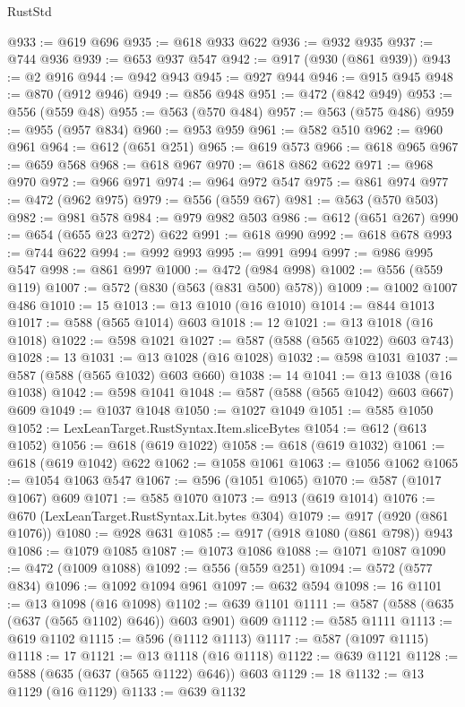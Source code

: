 \begin{lexlean}{RustStd}
\begin{coremodule}
@933 := @619 @696
@935 := @618 @933 @622
@936 := @932 @935
@937 := @744 @936
@939 := @653 @937 @547
@942 := @917 (@930 (@861 @939))
@943 := @2 @916
@944 := @942 @943
@945 := @927 @944
@946 := @915 @945
@948 := @870 (@912 @946)
@949 := @856 @948
@951 := @472 (@842 @949)
@953 := @556 (@559 @48)
@955 := @563 (@570 @484)
@957 := @563 (@575 @486)
@959 := @955 (@957 @834)
@960 := @953 @959
@961 := @582 @510
@962 := @960 @961
@964 := @612 (@651 @251)
@965 := @619 @573
@966 := @618 @965
@967 := @659 @568
@968 := @618 @967
@970 := @618 @862 @622
@971 := @968 @970
@972 := @966 @971
@974 := @964 @972 @547
@975 := @861 @974
@977 := @472 (@962 @975)
@979 := @556 (@559 @67)
@981 := @563 (@570 @503)
@982 := @981 @578
@984 := @979 @982 @503
@986 := @612 (@651 @267)
@990 := @654 (@655 @23 @272) @622
@991 := @618 @990
@992 := @618 @678
@993 := @744 @622
@994 := @992 @993
@995 := @991 @994
@997 := @986 @995 @547
@998 := @861 @997
@1000 := @472 (@984 @998)
@1002 := @556 (@559 @119)
@1007 := @572 (@830 (@563 (@831 @500) @578))
@1009 := @1002 @1007 @486
@1010 := 15
@1013 := @13 @1010 (@16 @1010)
@1014 := @844 @1013
@1017 := @588 (@565 @1014) @603
@1018 := 12
@1021 := @13 @1018 (@16 @1018)
@1022 := @598 @1021
@1027 := @587 (@588 (@565 @1022) @603 @743)
@1028 := 13
@1031 := @13 @1028 (@16 @1028)
@1032 := @598 @1031
@1037 := @587 (@588 (@565 @1032) @603 @660)
@1038 := 14
@1041 := @13 @1038 (@16 @1038)
@1042 := @598 @1041
@1048 := @587 (@588 (@565 @1042) @603 @667) @609
@1049 := @1037 @1048
@1050 := @1027 @1049
@1051 := @585 @1050
@1052 := LexLeanTarget.RustSyntax.Item.sliceBytes
@1054 := @612 (@613 @1052)
@1056 := @618 (@619 @1022)
@1058 := @618 (@619 @1032)
@1061 := @618 (@619 @1042) @622
@1062 := @1058 @1061
@1063 := @1056 @1062
@1065 := @1054 @1063 @547
@1067 := @596 (@1051 @1065)
@1070 := @587 (@1017 @1067) @609
@1071 := @585 @1070
@1073 := @913 (@619 @1014)
@1076 := @670 (LexLeanTarget.RustSyntax.Lit.bytes @304)
@1079 := @917 (@920 (@861 @1076))
@1080 := @928 @631
@1085 := @917 (@918 @1080 (@861 @798)) @943
@1086 := @1079 @1085
@1087 := @1073 @1086
@1088 := @1071 @1087
@1090 := @472 (@1009 @1088)
@1092 := @556 (@559 @251)
@1094 := @572 (@577 @834)
@1096 := @1092 @1094 @961
@1097 := @632 @594
@1098 := 16
@1101 := @13 @1098 (@16 @1098)
@1102 := @639 @1101
@1111 := @587 (@588 (@635 (@637 (@565 @1102) @646)) @603 @901) @609
@1112 := @585 @1111
@1113 := @619 @1102
@1115 := @596 (@1112 @1113)
@1117 := @587 (@1097 @1115)
@1118 := 17
@1121 := @13 @1118 (@16 @1118)
@1122 := @639 @1121
@1128 := @588 (@635 (@637 (@565 @1122) @646)) @603
@1129 := 18
@1132 := @13 @1129 (@16 @1129)
@1133 := @639 @1132

\end{coremodule}
\end{lexlean}
